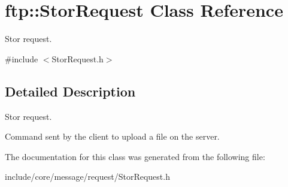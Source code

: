 \hypertarget{classftp_1_1_stor_request}{\section{ftp\-:\-:Stor\-Request Class Reference}
\label{classftp_1_1_stor_request}
}


Stor request.  




{\ttfamily \#include $<$Stor\-Request.\-h$>$}



\subsection{Detailed Description}
Stor request. 

Command sent by the client to upload a file on the server. 

The documentation for this class was generated from the following file\-:\begin{DoxyCompactItemize}
\item 
include/core/message/request/Stor\-Request.\-h\end{DoxyCompactItemize}
